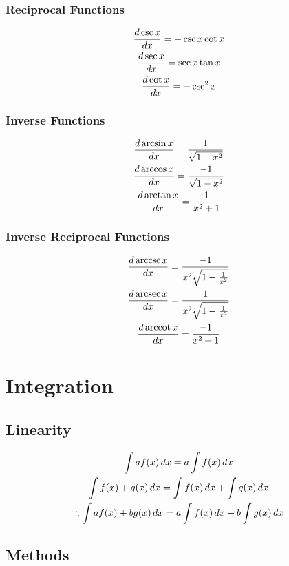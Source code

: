 \documentclass[12pt]{article}
\begin{document}
			\subsubsection{Reciprocal Functions}
				\begin{gather}
					\frac{d \csc x}{dx} = -\csc x \cot x \\
					\frac{d \sec x}{dx} = \sec x \tan x \\
					\frac{d \cot x}{dx} = -\csc^2 x
				\end{gather}
			\subsubsection{Inverse Functions}
				\begin{gather}
					\frac{d \arcsin x}{dx} = \frac{1}{\sqrt{1 -
					x^2}} \\
					\frac{d \arccos x}{dx} = \frac{-1}{\sqrt{1 -
					x^2}}  \\
					\frac{d \arctan x}{dx} = \frac{1}{x^2 + 1}
				\end{gather}
			\subsubsection{Inverse Reciprocal Functions}
				\newcommand{\arccsc}[0]{\,\text{arccsc}\,}
				\newcommand{\arcsec}[0]{\,\text{arcsec}\,}
				\newcommand{\arccot}[0]{\,\text{arccot}\,}
				\begin{gather}
					\deriv{\arccsc x} = \frac{-1}{x^2\sqrt{1
					- \frac{1}{x^2}}} \\
					\deriv{\arcsec x} = \frac{1}{x^2\sqrt{1
					- \frac{1}{x^2}}} \\
					\deriv{\arccot x} = \frac{-1}{x^2 + 1}
				\end{gather}
	\section{Integration}
		\subsection{Linearity}
			\begin{gather}
				\int af(x)\,dx = a\int f(x)\,dx \\
				\int f(x) + g(x)\,dx = \int f(x)\,dx +
				\int g(x)\,dx \\
				\therefore \int af(x) + bg(x)\,dx = a\int f(x)\,dx
				+ b\int g(x)\,dx
			\end{gather}
		\subsection{Methods}
\end{document}
